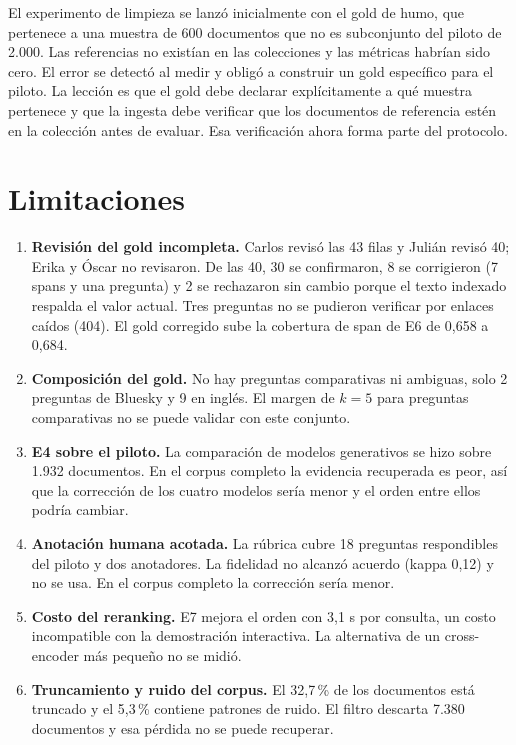 \documentclass[11pt]{tg_usta}
\begin{document}
El experimento de limpieza se lanzó inicialmente con el gold de humo, que pertenece a una muestra de 600 documentos que no es subconjunto del piloto de 2.000. Las referencias no existían en las colecciones y las métricas habrían sido cero. El error se detectó al medir y obligó a construir un gold específico para el piloto. La lección es que el gold debe declarar explícitamente a qué muestra pertenece y que la ingesta debe verificar que los documentos de referencia estén en la colección antes de evaluar. Esa verificación ahora forma parte del protocolo.

\section{Limitaciones}
\label{sec:limitaciones}

\begin{enumerate}
\item \textbf{Revisión del gold incompleta.} Carlos revisó las 43 filas y Julián revisó 40; Erika y Óscar no revisaron. De las 40, 30 se confirmaron, 8 se corrigieron (7 spans y una pregunta) y 2 se rechazaron sin cambio porque el texto indexado respalda el valor actual. Tres preguntas no se pudieron verificar por enlaces caídos (404). El gold corregido sube la cobertura de span de E6 de 0,658 a 0,684.
\item \textbf{Composición del gold.} No hay preguntas comparativas ni ambiguas, solo 2 preguntas de Bluesky y 9 en inglés. El margen de $k=5$ para preguntas comparativas no se puede validar con este conjunto.
\item \textbf{E4 sobre el piloto.} La comparación de modelos generativos se hizo sobre 1.932 documentos. En el corpus completo la evidencia recuperada es peor, así que la corrección de los cuatro modelos sería menor y el orden entre ellos podría cambiar.
\item \textbf{Anotación humana acotada.} La rúbrica cubre 18 preguntas respondibles del piloto y dos anotadores. La fidelidad no alcanzó acuerdo (kappa 0,12) y no se usa. En el corpus completo la corrección sería menor.
\item \textbf{Costo del reranking.} E7 mejora el orden con 3,1 s por consulta, un costo incompatible con la demostración interactiva. La alternativa de un cross-encoder más pequeño no se midió.
\item \textbf{Truncamiento y ruido del corpus.} El 32,7\,\% de los documentos está truncado y el 5,3\,\% contiene patrones de ruido. El filtro descarta 7.380 documentos y esa pérdida no se puede recuperar.

\end{enumerate}
\end{document}
